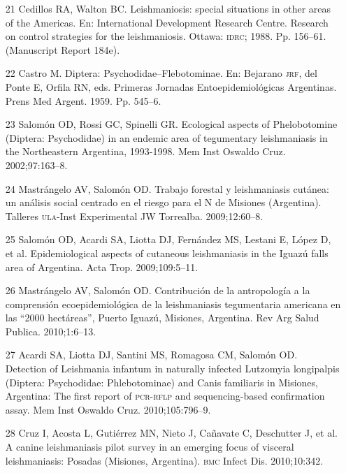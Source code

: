 \documentclass{article}
\begin{document}
\begin{itemize}
\item[21] Cedillos RA, Walton BC. Leishmaniosis: special situations in other
areas of the Americas. En: International Development Research Centre. Research
on control strategies for the leishmaniosis. Ottawa: \textsc{idrc}; 1988. Pp. 156–61.
(Manuscript Report 184e).

\item[22] Castro M. Diptera: Psychodidae–Flebotominae. En: Bejarano \textsc{jrf}, del
Ponte E, Orfila RN, eds. Primeras Jornadas Entoepidemiológicas Argentinas. Prens
Med Argent. 1959. Pp. 545–6.

\item[23] Salomón OD, Rossi GC, Spinelli GR. Ecological aspects of
Phelobotomine (Diptera: Psychodidae) in an endemic area of tegumentary
leishmaniasis in the Northeastern Argentina, 1993-1998. Mem Inst Oswaldo Cruz.
2002;97:163–8.

\item[24] Mastrángelo AV, Salomón OD. Trabajo forestal y leishmaniasis
cutánea: un análisis social centrado en el riesgo para el N de Misiones
(Argentina). Talleres \textsc{ula}-Inst Experimental JW Torrealba. 2009;12:60–8.

\item[25] Salomón OD, Acardi SA, Liotta DJ, Fernández MS, Lestani E, López D,
et al. Epidemiological aspects of cutaneous leishmaniasis in the Iguazú falls
area of Argentina. Acta Trop. 2009;109:5–11.

\item[26] Mastrángelo AV, Salomón OD. Contribución de la antropología a la
comprensión ecoepidemiológica de la leishmaniasis tegumentaria americana en las
“2000 hectáreas”, Puerto Iguazú, Misiones, Argentina. Rev Arg Salud Publica.
2010;1:6–13.

\item[27] Acardi SA, Liotta DJ, Santini MS, Romagosa CM, Salomón OD.
Detection of Leishmania infantum in naturally infected Lutzomyia longipalpis
(Diptera: Psychodidae: Phlebotominae) and Canis familiaris in Misiones,
Argentina: The first report of \textsc{pcr}-\textsc{rflp} and sequencing-based confirmation assay.
Mem Inst Oswaldo Cruz. 2010;105:796–9.

\item[28] Cruz I, Acosta L, Gutiérrez MN, Nieto J, Cañavate C, Deschutter J,
et al. A canine leishmaniasis pilot survey in an emerging focus of visceral
leishmaniasis: Posadas (Misiones, Argentina). \textsc{bmc} Infect Dis. 2010;10:342.


\end{itemize}
\end{document}
